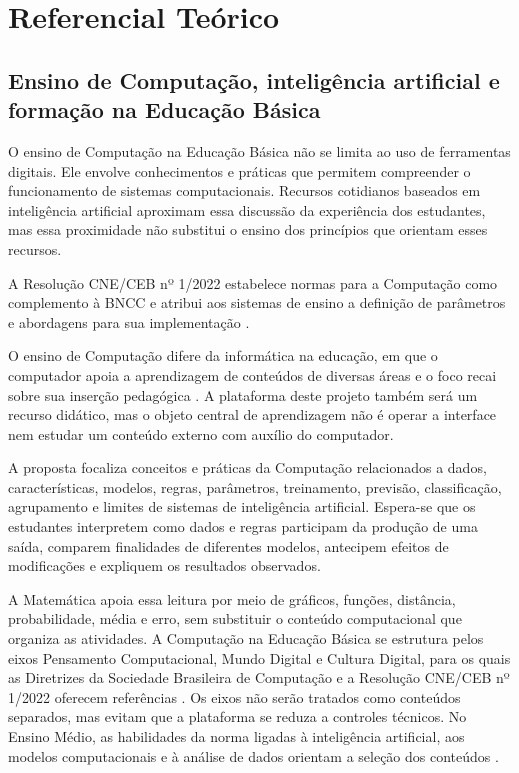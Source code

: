 \chapter{Referencial Teórico}

\section{Ensino de Computação, inteligência artificial e formação na Educação Básica}

O ensino de Computação na Educação Básica não se limita ao uso de ferramentas digitais. Ele envolve conhecimentos e práticas que permitem compreender o funcionamento de sistemas computacionais. Recursos cotidianos baseados em inteligência artificial aproximam essa discussão da experiência dos estudantes, mas essa proximidade não substitui o ensino dos princípios que orientam esses recursos.

A Resolução CNE/CEB nº 1/2022 estabelece normas para a Computação como complemento à BNCC e atribui aos sistemas de ensino a definição de parâmetros e abordagens para sua implementação \cite{brasil2022computacao}.

O ensino de Computação difere da informática na educação, em que o computador apoia a aprendizagem de conteúdos de diversas áreas e o foco recai sobre sua inserção pedagógica \cite{valente2002uso}. A plataforma deste projeto também será um recurso didático, mas o objeto central de aprendizagem não é operar a interface nem estudar um conteúdo externo com auxílio do computador.

A proposta focaliza conceitos e práticas da Computação relacionados a dados, características, modelos, regras, parâmetros, treinamento, previsão, classificação, agrupamento e limites de sistemas de inteligência artificial. Espera-se que os estudantes interpretem como dados e regras participam da produção de uma saída, comparem finalidades de diferentes modelos, antecipem efeitos de modificações e expliquem os resultados observados.

A Matemática apoia essa leitura por meio de gráficos, funções, distância, probabilidade, média e erro, sem substituir o conteúdo computacional que organiza as atividades. A Computação na Educação Básica se estrutura pelos eixos Pensamento Computacional, Mundo Digital e Cultura Digital, para os quais as Diretrizes da Sociedade Brasileira de Computação e a Resolução CNE/CEB nº 1/2022 oferecem referências \cite{sbc2018diretrizes,brasil2022computacao}. Os eixos não serão tratados como conteúdos separados, mas evitam que a plataforma se reduza a controles técnicos. No Ensino Médio, as habilidades da norma ligadas à inteligência artificial, aos modelos computacionais e à análise de dados orientam a seleção dos conteúdos \cite{brasil2022computacao}.

